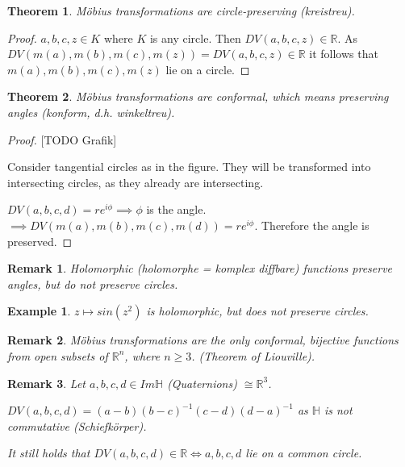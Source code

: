 \documentclass[]{article}
\newtheorem{theorem}{Theorem}
\newtheorem{example}{Example}
\newtheorem{remark}{Remark}
\begin{document}
\begin{theorem}
	Möbius transformations are circle-preserving (kreistreu).
\end{theorem}

\begin{proof}
	$a,b,c,z \in K$ where $K$ is any circle. Then $DV(a,b,c,z) \in \mathbb{R}$. As $DV(m(a), m(b), m(c), m(z)) = DV(a,b,c,z) \in \mathbb{R}$ it follows that $m(a), m(b), m(c), m(z)$ lie on a circle.
\end{proof}

\begin{theorem}
	Möbius transformations are conformal, which means preserving angles (konform, d.h. winkeltreu).
\end{theorem}

\begin{proof}
	
	[TODO Grafik]
	
	Consider tangential circles as in the figure. They will be transformed into intersecting circles, as they already are intersecting.
	
	$DV(a,b,c,d) = r e^{i\phi} \implies \phi$ is the angle. $\implies DV(m(a), m(b), m(c), m(d)) = r e^{i\phi}$. Therefore the angle is preserved. 
	
\end{proof}

\begin{remark}
	Holomorphic (holomorphe = komplex diffbare) functions preserve angles, but do not preserve circles.
\end{remark}

\begin{example}
	$z \mapsto sin(z^2)$ is holomorphic, but does not preserve circles.
\end{example}

\begin{remark}
	Möbius transformations are the only conformal, bijective functions from open subsets of $\mathbb{R}^n$, where $n \geq 3$. (Theorem of Liouville).
\end{remark}

\begin{remark}
	Let $a,b,c,d \in Im \mathbb{H}$ (Quaternions) $\cong \mathbb{R}^3$.
	
	$DV(a,b,c,d) = (a-b) (b-c)^{-1} (c-d) (d-a)^{-1}$ as $\mathbb{H}$ is not commutative (Schiefkörper).
	
	It still holds that $DV(a,b,c,d) \in \mathbb{R} \iff a,b,c,d$ lie on a common circle.
\end{remark}
\end{document}

